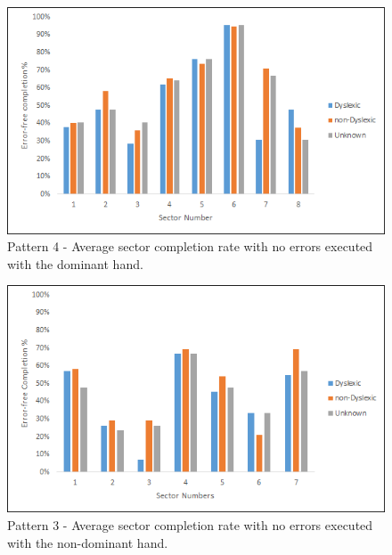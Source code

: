 		\begin{figure}[]
			\centering
			\includegraphics[width = \textwidth]{../images/pat_4_com_dom}
			\caption{Pattern 4 - Average sector completion rate with no errors executed with the dominant hand.}
			\label{fig_pat_4_com_dom}
		\end{figure}
		
		\begin{figure}[]
			\centering
			\includegraphics[width = \textwidth]{../images/pat_3_com_ndom}
			\caption{Pattern 3 - Average sector completion rate with no errors executed with the non-dominant hand.}
			\label{fig_pat_3_com_ndom}
		\end{figure}		
		
